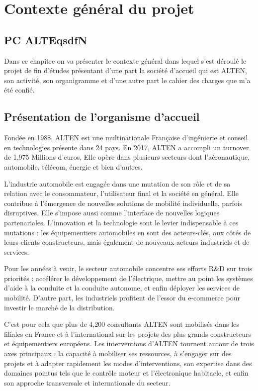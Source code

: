 \chapter{Contexte général du projet}
\section*{PC ALTEqsdfN}
Dans ce chapitre on va présenter le contexte général dans lequel s’est déroulé le projet de fin d’études présentant d’une part la société d’accueil qui est ALTEN, son activité, son organigramme et d’une autre part le cahier des charges que m’a été confié.

\section{Présentation de l'organisme d'accueil}
Fondée en 1988, ALTEN est une multinationale Française d’ingénierie et conseil en technologies présente dans 24 pays. En 2017, ALTEN a accompli un turnover de 1,975 Millions d’euros, Elle opère dans plusieurs secteurs dont l’aéronautique, automobile, télécom, énergie et bien d’autres. 

L’industrie automobile est engagée dans une mutation de son rôle et de sa relation avec le consommateur, l’utilisateur final et la société en général. Elle contribue à l’émergence de nouvelles solutions de mobilité individuelle, parfois disruptives. Elle s’impose aussi comme l’interface de nouvelles logiques partenariales. L’innovation et la technologie sont le levier indispensable à ces mutations : les équipementiers automobiles en sont des acteurs-clés, aux côtés de leurs clients constructeurs, mais également de nouveaux acteurs industriels et de services.

Pour les années à venir, le secteur automobile concentre ses efforts R\&D sur trois priorités : accélérer le développement de l’électrique, mettre au point les systèmes d’aide à la conduite et la conduite autonome, et enfin déployer les services de mobilité. D’autre part, les industriels profitent de l’essor du e-commerce pour investir le marché de la distribution.

C’est pour cela que plus de 4,200 consultants ALTEN sont mobilisés dans les filiales en France et à l’international sur les projets des plus grands constructeurs et équipementiers européens. Les interventions d’ALTEN tournent autour de trois axes principaux : la capacité à mobiliser ses ressources, à s’engager sur des projets et à adapter rapidement les modes d’interventions, son expertise dans des domaines pointus tels que le contrôle moteur et l’électronique habitacle, et enfin son approche transversale et internationale du secteur.

